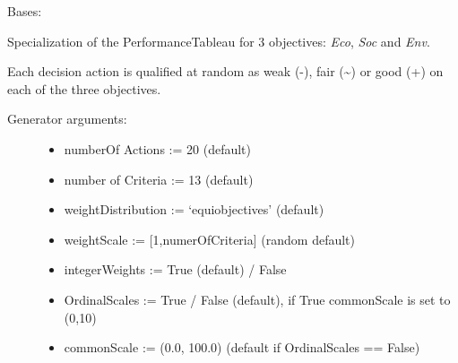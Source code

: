 \documentclass[letterpaper,10pt,english]{sphinxmanual}
\begin{document}
\begin{fulllineitems}
\label{techDoc:randomPerfTabs.Random3ObjectivesPerformanceTableau}
Bases: {\hyperref[techDoc:perfTabs.PerformanceTableau]{\emph{}}}

Specialization of the PerformanceTableau
for 3 objectives: \emph{Eco}, \emph{Soc} and \emph{Env}.

Each decision action is qualified at random as weak (-), fair (\textasciitilde{}) or good (+)
on each of the three objectives.
\begin{description}
\item[{Generator arguments:}] \leavevmode\begin{itemize}
\item {} 
numberOf Actions := 20 (default)

\item {} 
number of Criteria := 13 (default)

\item {} \begin{description}
\item[{weightDistribution := `equiobjectives' (default)}] \leavevmode
{}

\end{description}

\item {} 
weightScale := {[}1,numerOfCriteria{]} (random default)

\item {} 
integerWeights := True (default) / False

\item {} 
OrdinalScales := True / False (default), if True commonScale is set to (0,10)

\item {} 
commonScale := (0.0, 100.0) (default if OrdinalScales == False)


\end{itemize}
\end{description}
\end{fulllineitems}
\end{document}
